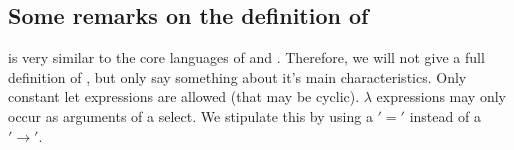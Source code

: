 \subsection{Some remarks on the definition of \Sapl}
\Sapl is very similar to the core languages of \Haskell and \Clean. 
Therefore, we will not give a full definition of \Sapl, but only say something about it's main characteristics.
Only constant let expressions are allowed (that may be cyclic).
$\lambda$ expressions may only occur as arguments of a \textsf{select}. We stipulate this by using a $'='$ instead of a $'\to'$.




